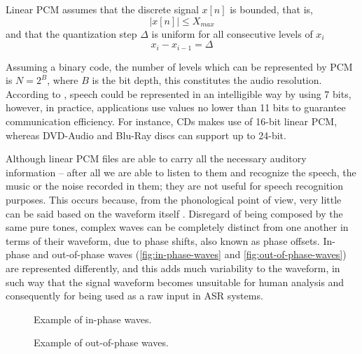 Linear PCM assumes that the discrete signal $x[n]$ is bounded, that is,
\begin{equation}
|x[n]| \leq X_{max} 
\end{equation}
and that the quantization step $\Delta$ is uniform for all consecutive levels of $x_i$
\begin{equation}
x_i - x_{i-1} = \Delta
\end{equation}

Assuming a binary code, the number of levels which can be represented by PCM is $N=2^B$, where $B$ is the bit depth, this constitutes
the audio resolution. According to \citep{Huang2001}, speech could be represented in an intelligible way by using 7 bits, however, in 
practice, applications use values no lower than 11 bits to guarantee communication efficiency. For instance, CDs makes use of 16-bit 
linear PCM, whereas DVD-Audio and Blu-Ray discs can support up to 24-bit.

Although linear PCM files are able to carry all the necessary auditory information -- after all we are able to listen to them and
recognize the speech, the music or the noise recorded in them; they are not useful for speech recognition purposes. This occurs 
because, from the phonological point of view, very little can be said based on the waveform itself \citep{Shrawankar2010}. Disregard of being composed by the same pure tones, complex waves can be completely distinct from one another in terms of their waveform, due to phase shifts, also known as phase offsets. In-phase and out-of-phase waves (\autoref{fig:in-phase-waves} and
\autoref{fig:out-of-phase-waves}) are represented differently, and this adds much variability to the waveform, in such way that
the signal waveform becomes unsuitable for human analysis and consequently for being used as a raw input in \ac{ASR} systems. 

\begin{figure}[!ht]
        \noindent{}
        \caption{Example of in-phase waves.}
        \label{fig:in-phase-waves}
\end{figure}

\begin{figure}[!ht]
        \noindent{}
        \caption{Example of out-of-phase waves.}
        \label{fig:out-of-phase-waves}
\end{figure}

